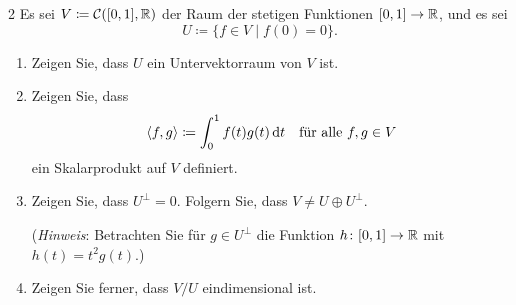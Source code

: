 \begin{question}[subtitle = Ein $L^2$-Skalarprodukt und ein Gegenbeispiel im Unendlichdimensionalen]{2}
  Es sei $V \coloneqq \mathcal{C}([0,1], \mathbb{R})$ der Raum der stetigen Funktionen $[0,1] \to \mathbb{R}$, und es sei
  \[
    U \coloneqq \{ f \in V \mid f(0) = 0 \}.
  \]
  \begin{enumerate}[leftmargin=*]
    \item
      Zeigen Sie, dass $U$ ein Untervektorraum von $V$ ist.
    \item
      Zeigen Sie, dass
      \[
        \left\langle f, g \right\rangle \coloneqq \int_0^1 f(t) g(t) \,\text{d}t
        \quad
        \text{für alle $f, g \in V$}
      \]
      ein Skalarprodukt auf $V$ definiert.
    \item
      Zeigen Sie, dass $U^\perp = 0$.
      Folgern Sie, dass $V \neq U \oplus U^\perp$.
      
      (\emph{Hinweis}:
       Betrachten Sie für $g \in U^\perp$ die Funktion $h \colon [0,1] \to \mathbb{R}$ mit $h(t) = t^2 g(t)$.)
    \item
      Zeigen Sie ferner, dass $V\!/U$ eindimensional ist.
  \end{enumerate}
\end{question}


